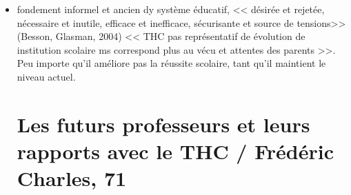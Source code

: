 \documentclass[12pt]{article}
\begin{document}
\begin{itemize}[label=]
\item fondement informel et ancien dy système éducatif, << désirée et rejetée, nécessaire et inutile, efficace et inefficace, sécurisante et source de tensions>> (Besson, Glasman, 2004)  << THC pas représentatif de évolution de institution scolaire ms correspond plus au vécu et attentes des parents >>. Peu importe qu'il améliore pas la réussite scolaire, tant qu'il maintient le niveau actuel.

\chapter{Les futurs professeurs et leurs rapports avec le THC / Frédéric Charles, 71}


\newpage









\end{itemize}
\end{document}
